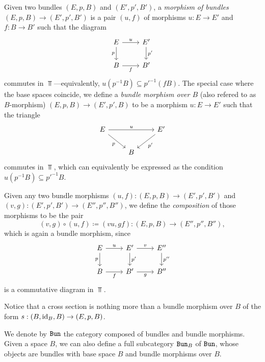 \documentclass[../../../deep-dive]{subfile}
\begin{document}
\begin{definition}
\label{def:bundle-morphism}
Given two bundles \((E, p, B)\) and \((E', p', B')\), a \emph{morphism of
  bundles} \((E, p, B) \to (E', p', B')\) is a pair \((u, f)\) of morphisms
\(u: E \to E'\) and \(f: B \to B'\) such that the diagram
\[
\begin{tikzcd}
E \ar[r, "u"] \ar[d, "p"'] &E' \ar[d, "p'"] \\
B \ar[r, "f"'] &B'
\end{tikzcd}
\]
commutes in \(\Top\)---equivalently, \(u (p^{-1} B) \subseteq p'^{-1}(f
B)\). The special case where the base spaces coincide, we define a \emph{bundle
  morphism over \(B\)} (also refered to as \(B\)-morphism)
\((E, p, B) \to (E', p', B)\) to be a morphism \(u: E \to E'\) such that the
triangle
\[
\begin{tikzcd}
E \ar[rr, "u"] \ar[dr, "p"'] & &E' \ar[ld, "p'"] \\
&B &
\end{tikzcd}
\]
commutes in \(\Top\), which can equivalently be expressed as the condition
\(u (p^{-1} B) \subseteq p'^{-1} B\).

Given any two bundle morphisms \((u, f): (E, p, B) \to (E', p', B')\) and \((v,
g): (E', p', B') \to (E'', p'', B'')\), we define the \emph{composition} of
those morphisms to be the pair
\[
(v, g) \circ (u, f) \coloneq (v u, g f):
(E, p, B) \longrightarrow (E'', p'', B''),
\]
which is again a bundle morphism, since
\[
\begin{tikzcd}
E \ar[r, "u"] \ar[d, "p"']
&E' \ar[d, "p'"] \ar[r, "v"]
&E'' \ar[d, "p''"]
\\
B \ar[r, "f"']
&B' \ar[r, "g"']
&B''
\end{tikzcd}
\]
is a commutative diagram in \(\Top\).
\end{definition}

\begin{example}
\label{exp:cross-section-is-bundle-morphism}
Notice that a cross section is nothing more than a bundle morphism over \(B\) of
the form \(s: (B, \operatorname{id}_B, B) \to (E, p, B)\).
\end{example}

\begin{definition}
\label{def:category-of-bundles}
We denote by \({\texttt{Bun}}\) the category composed of bundles and bundle
morphisms. Given a space \(B\), we can also define a full subcategory \({\texttt{Bun}}_B\)
of \({\texttt{Bun}}\), whose objects are bundles with base space \(B\) and bundle
morphisms over \(B\).
\end{definition}
\end{document}
